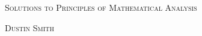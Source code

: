 \documentclass[dvipsnames,svgnames,x11names]{scrbook}%
\begin{document}
\pagecolor{PaleGreen1}
\begin{center}
  \begin{center}
  \vspace*{\fill}
  \textsc{\LARGE Solutions to Principles of Mathematical Analysis}
  \bigskip

  \textsc{\LARGE Dustin Smith}
  \vspace*{\fill}
\end{center}
\end{center}

\newpage

\tableofcontents

\newpage






\end{document}
